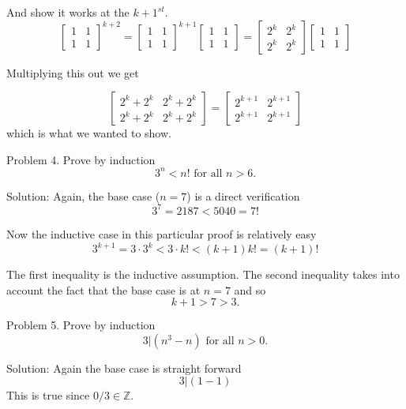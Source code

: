 \documentclass[16 pt]{amsart}
\theoremstyle{definition}
\theoremstyle{remark}
\numberwithin{equation}{subsection}
\newcommand{\Z}{\mathbb{Z}}
\begin{document}
And show it works at the $k+1^{st}$.
\[
\begin{bmatrix}
1 & 1\\
1 & 1
\end{bmatrix}^{k+2} = 
\begin{bmatrix}
1 & 1\\
1 & 1
\end{bmatrix}^{k+1}
\begin{bmatrix}
1 & 1\\
1 & 1
\end{bmatrix} =
\begin{bmatrix}
2^k & 2^k \\
2^k & 2^k
\end{bmatrix}
\begin{bmatrix}
1 & 1\\
1 & 1
\end{bmatrix}
\]


Multiplying this out we get

\[
\begin{bmatrix}
2^k + 2^k & 2^k + 2^k\\
2^k + 2^k & 2^k + 2^k
\end{bmatrix} = 
\begin{bmatrix}
2^{k+1} & 2^{k+1}\\
2^{k+1} & 2^{k+1}
\end{bmatrix}
\]
which is what we wanted to show.

\newpage


Problem 4.
Prove by induction
\[
3^n < n! \text{ for all } n>6.
\]

\vspace{1in}

Solution: Again, the base case ($n=7$) is a direct verification
\[
3^7 = 2187 < 5040 = 7!
\]


Now the inductive case in this particular proof is relatively easy
\[
3^{k+1} = 3\cdot 3^k < 3\cdot k! < (k+1)k! = (k+1)!
\]

The first inequality is the inductive assumption.  The second inequality takes into account the fact that the base case is at $n=7$ and so
\[
k+1 > 7 > 3.
\]

\newpage 

Problem 5.
Prove by induction
\[
3 | (n^3-n) \text{ for all } n>0.
\]

\vspace{1in}

Solution: Again the base case is straight forward
\[
3| (1-1) 
\]
This is true since $0/3\in \Z$.
\end{document}
